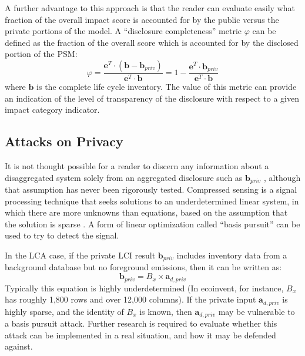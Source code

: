 A further advantage to this approach is that the reader can evaluate easily what fraction of the overall impact score is accounted for by the public versus the private portions of the model.  A ``disclosure completeness'' metric $\varphi$ can be defined as the fraction of the overall score which is accounted for by the disclosed portion of the PSM:
\begin{equation}
  \varphi =  \frac{\mathbf{e}^T\cdot(\mathbf{b} - \mathbf{b}_{priv})}{\mathbf{e}^T\cdot\mathbf{b}} = 1 - \frac{\mathbf{e}^T\cdot\mathbf{b}_{priv}}{\mathbf{e}^T\cdot\mathbf{b}}
  \label{eqn:metric}
\end{equation}
where $\mathbf{b}$ is the complete life cycle inventory.  The value of this metric can provide an indication of the level of transparency of the disclosure with respect to a given impact category indicator.  

\subsection{Attacks on Privacy}

It is not thought possible for a reader to discern any information about a disaggregated system solely from an aggregated disclosure such as $\mathbf{b}_{priv}$ \citep[Ch. 3]{UNEP_2011}, although that assumption has never been rigorously tested.  Compressed sensing is a signal processing technique that seeks solutions to an underdetermined linear system, in which there are more unknowns than equations, based on the assumption that the solution is sparse \citep{Donoho_2006}.  A form of linear optimization called ``basis pursuit'' can be used to try to detect the signal.

In the LCA case, if the private LCI result $\mathbf{b}_{priv}$ includes inventory data from a background database but no foreground emissions, then it can be written as:
\begin{equation}
  \mathbf{b}_{priv} = B_x\times \mathbf{a}_{d,priv}
\end{equation}
Typically this equation is highly underdetermined (In ecoinvent, for instance, $B_x$ has roughly 1,800 rows and over 12,000 columns).  If the private input $\mathbf{a}_{d,priv}$ is highly sparse, and the identity of $B_x$ is known, then $\mathbf{a}_{d,priv}$ may be vulnerable to a basis pursuit attack.  Further research is required to evaluate whether this attack can be implemented in a real situation, and how it may be defended against.  
